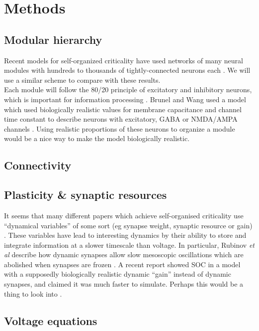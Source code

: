 \documentclass[a4paper, 12pt]{article}
\begin{document}
\section*{Methods}

\subsection*{Modular hierarchy}
Recent models for self-organized criticality have used networks of many neural modules with hundreds to thousands of tightly-connected neurons each \cite{munozlg, rubinov}. We will use a similar scheme to compare with these results.\\

Each module will follow the 80/20 principle of excitatory and inhibitory neurons, which is important for information processing \cite{larremorerestrepo, entropyinhibition}. Brunel and Wang used a model which used biologically realistic values for membrane capacitance and channel time constant to describe neurons with excitatory, GABA or NMDA/AMPA channels \cite{objectworkingmemory}. Using realistic proportions of these neurons to organize a module would be a nice way to make the model biologically realistic.\\

\subsection*{Connectivity}
\subsection*{Plasticity \& synaptic resources}
It seems that many different papers which achieve self-organised criticality use ``dynamical variables'' of some sort (eg synapse weight, synaptic resource or gain) \cite{munozlg, rubinov, kinouchi}. These variables have lead to interesting dynamics by their ability to store and integrate information at a slower timescale than voltage. In particular, Rubinov \textit{et al} describe how dynamic synapses allow slow mesoscopic oscillations which are abolished when synapses are frozen \cite{rubinov}. A recent report showed SOC in a model with a supposedly biologically realistic dynamic ``gain'' instead of dynamic synapses, and claimed it was much faster to simulate. Perhaps this would be a thing to look into \cite{kinouchi}.\\

\subsection*{Voltage equations}
\end{document}
